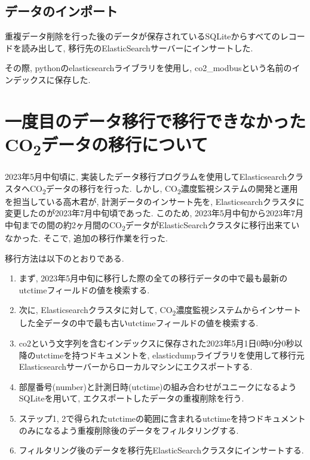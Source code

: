 \subsection{データのインポート}
重複データ削除を行った後のデータが保存されているSQLiteからすべてのレコードを読み出して, 移行先のElasticSearchサーバーにインサートした.

その際, pythonのelasticsearchライブラリを使用し, co2\_modbusという名前のインデックスに保存した.

\section{一度目のデータ移行で移行できなかったCO\textsubscript{2}データの移行について}

2023年5月中旬頃に, 実装したデータ移行プログラムを使用してElasticsearchクラスタへCO\textsubscript{2}データの移行を行った. しかし, CO\textsubscript{2}濃度監視システムの開発と運用を担当している高木君が, 計測データのインサート先を, Elasticsearchクラスタに変更したのが2023年7月中旬頃であった. このため, 2023年5月中旬から2023年7月中旬までの間の約2ヶ月間のCO\textsubscript{2}データがElasticSearchクラスタに移行出来ていなかった. そこで, 追加の移行作業を行った.

移行方法は以下のとおりである.

\begin{enumerate}
  \item まず, 2023年5月中旬に移行した際の全ての移行データの中で最も最新のutctimeフィールドの値を検索する.
  \item 次に, Elasticsearchクラスタに対して, CO\textsubscript{2}濃度監視システムからインサートした全データの中で最も古いutctimeフィールドの値を検索する.
  \item co2という文字列を含むインデックスに保存された2023年5月1日0時0分0秒以降のutctimeを持つドキュメントを, elasticdumpライブラリを使用して移行元Elasticsearchサーバーからローカルマシンにエクスポートする.
  \item 部屋番号(number)と計測日時(utctime)の組み合わせがユニークになるようSQLiteを用いて, エクスポートしたデータの重複削除を行う.
  \item ステップ1, 2で得られたutctimeの範囲に含まれるutctimeを持つドキュメントのみになるよう重複削除後のデータをフィルタリングする.
  \item フィルタリング後のデータを移行先ElasticSearchクラスタにインサートする.
\end{enumerate}

